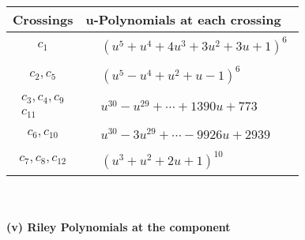 \documentclass[1p]{elsarticle_modified}
\theoremstyle{definition}
\begin{document}
\begin{tabular}{m{50pt}|m{274pt}}
Crossings & \hspace{64pt}u-Polynomials at each crossing \\
\hline $$\begin{aligned}c_{1}\end{aligned}$$&$\begin{aligned}
&(u^5+u^4+4 u^3+3 u^2+3 u+1)^6
\end{aligned}$\\
\hline $$\begin{aligned}c_{2},c_{5}\end{aligned}$$&$\begin{aligned}
&(u^5- u^4+u^2+u-1)^6
\end{aligned}$\\
\hline $$\begin{aligned}c_{3},c_{4},c_{9}\\c_{11}\end{aligned}$$&$\begin{aligned}
&u^{30}- u^{29}+\cdots+1390 u+773
\end{aligned}$\\
\hline $$\begin{aligned}c_{6},c_{10}\end{aligned}$$&$\begin{aligned}
&u^{30}-3 u^{29}+\cdots-9926 u+2939
\end{aligned}$\\
\hline $$\begin{aligned}c_{7},c_{8},c_{12}\end{aligned}$$&$\begin{aligned}
&(u^3+u^2+2 u+1)^{10}
\end{aligned}$\\
\hline
\end{tabular}\\~\\
\newpage\renewcommand{\arraystretch}{1}
\flushleft \textbf{(v) Riley Polynomials at the component}\newline \\
\end{document}
